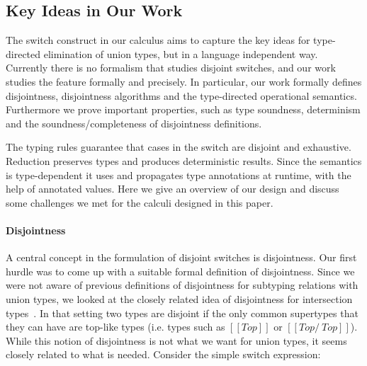 \begin{comment}
\paragraph{Existing problems in Ceylon}
In general, a term of type $A$ is always assignable to any supertype of $A$.
But in Ceylon, the checking of assignability is not complete to
subtyping.
Although the subtyping relation holds between \lstinline{v}'s
(declarative) type and \lstinline{Integer}, \lstinline{v}
is not assignable to \lstinline{Integer}, and the following program
cannot be accepted by Ceylon's compiler.

\begin{lstlisting}
	< Character | Integer > & < String | Integer > v = 100;
	switch (v)
	case (is Integer) { print("Integer: ``v``"); }
\end{lstlisting}
\end{comment}

\subsection{Key Ideas in Our Work}
The switch construct in our calculus \cal aims to capture the key ideas for
type-directed elimination of union types, but in a language independent way.
Currently there is no formalism that studies disjoint switches,
and our work studies the feature
formally and precisely. In particular, our work formally defines
disjointness, disjointness algorithms and the type-directed
operational semantics.
Furthermore we prove important properties, such as type soundness, determinism
and the soundness/completeness of disjointness definitions.

The typing rules guarantee that cases in the switch are disjoint and exhaustive.
Reduction preserves types and produces deterministic results. Since the semantics
is type-dependent it uses and propagates type annotations at runtime,
with the help of annotated values.
Here we give an overview of our design and discuss some challenges
we met for the calculi designed in this paper.

\paragraph{Disjointness}
A central concept in the formulation of disjoint switches is disjointness.
Our first hurdle was to come up with a suitable formal definition of disjointness.
Since we were not aware of previous definitions of disjointness
for subtyping relations with union types,
we looked at the closely related idea of disjointness for intersection
types~\cite{oliveira2016disjoint}. In that setting two types are disjoint
if the only common supertypes that they can have are top-like types (i.e.
types such as $[[Top]]$ or $[[Top /\ Top]]$). While this notion of
disjointness is not what we want for union types, it seems closely related
to what is needed. Consider the simple \cal switch expression:

